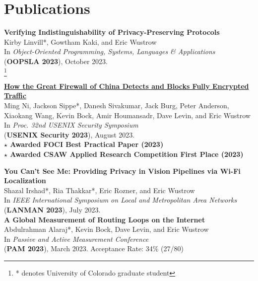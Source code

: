 \documentclass[margin,11pt]{res} %
\newcommand\blfootnote[1]{%
    \begingroup
    \renewcommand\thefootnote{}\footnote{#1}%
    \addtocounter{footnote}{-1}%
    \endgroup
}
\begin{document}

\vspace{6pt}
\section{\large Publications}

    \textbf{Verifying Indistinguishability of Privacy-Preserving Protocols} \\
    Kirby Linvill*, Gowtham Kaki, and Eric Wustrow \\
    In \emph{Object-Oriented Programming, Systems, Languages \& Applications} \\
    (\textbf{OOPSLA 2023}), October 2023. \\
    \blfootnote{* denotes University of Colorado graduate student}

    \textbf{\href{https://gfw.report/publications/usenixsecurity23/en/}{How the Great Firewall of China Detects and Blocks Fully Encrypted Traffic}} \\
    Ming Ni, Jackson Sippe*, Danesh Sivakumar, Jack Burg, Peter Anderson, Xiaokang Wang, Kevin Bock, Amir Houmansadr, Dave Levin, and Eric Wustrow \\
    In \emph{Proc. 32nd USENIX Security Symposium} \\
    (\textbf{USENIX Security 2023}), August 2023. \\
    \textbf{$\star$ Awarded FOCI Best Practical Paper (2023)} \\
    \textbf{$\star$ Awarded CSAW Applied Research Competition First Place (2023)}

    \textbf{You Can't See Me: Providing Privacy in Vision Pipelines via Wi-Fi Localization} \\
    Shazal Irshad*, Ria Thakkar*, Eric Rozner, and Eric Wustrow \\
    In \emph{IEEE International Symposium on Local and Metropolitan Area Networks} \\
    (\textbf{LANMAN 2023}), July 2023. \\

    \textbf{A Global Measurement of Routing Loops on the Internet} \\
    Abdulrahman Alaraj*, Kevin Bock, Dave Levin, and Eric Wustrow \\
    In \emph{Passive and Active Measurement Conference} \\
    (\textbf{PAM 2023}), March 2023.
    Acceptance Rate: 34\% (27/80) \\
\end{document}
